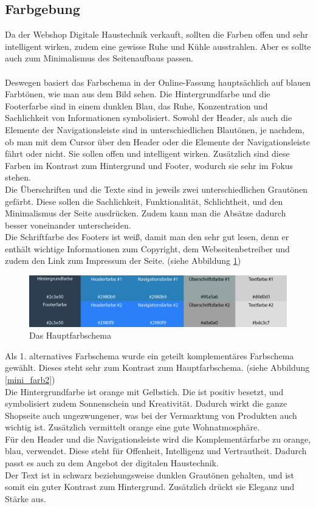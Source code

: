 	\subsection{Farbgebung}
	\label{farb_mini}
Da der Webshop Digitale Haustechnik verkauft, sollten die Farben offen und sehr intelligent wirken, zudem eine gewisse Ruhe und Kühle ausstrahlen. Aber es sollte auch zum Minimalismus des Seitenaufbaus passen.
\\
\\
Deswegen basiert das Farbschema in der Online-Fassung hauptsächlich auf blauen Farbtönen, wie man aus dem Bild sehen. Die Hintergrundfarbe und die Footerfarbe sind in einem dunklen Blau, das Ruhe, Konzentration und Sachlichkeit von Informationen symbolisiert. 
Sowohl der Header, als auch die Elemente der Navigationsleiste sind in unterschiedlichen Blautönen, je nachdem, ob man mit dem Cursor über den Header oder die Elemente der Navigationsleiste fährt oder nicht. Sie sollen offen und intelligent wirken. Zusätzlich sind diese Farben im Kontrast zum Hintergrund und Footer, wodurch sie sehr im Fokus stehen.
\\
Die Überschriften und die Texte sind in jeweils zwei unterschiedlichen Grautönen gefärbt. Diese sollen die Sachlichkeit, Funktionalität, Schlichtheit, und den Minimalismus der Seite ausdrücken. Zudem kann man die Absätze dadurch besser voneinander unterscheiden.
\\
Die Schriftfarbe des Footers ist weiß, damit man den sehr gut lesen, denn er enthält wichtige Informationen zum Copyright, dem Webseitenbetreiber und zudem den Link zum Impressum der Seite. (siehe Abbildung \ref{mini_farb1})
\begin{figure} [hp]
\includegraphics[width=\textwidth]{./img/mini_farb1.png}
\caption{Das Hauptfarbschema}
\label{mini_farb1}
\end{figure}

Als 1. alternatives Farbschema wurde ein geteilt komplementäres Farbschema gewählt. Dieses steht sehr zum Kontrast zum Hauptfarbschema. (siehe Abbildung \ref{mini_farb2}) 
\\
Die Hintergrundfarbe ist orange mit Gelbstich. Die ist positiv besetzt, und symbolisiert zudem Sonnenschein und Kreativität. Dadurch wirkt die ganze Shopseite auch ungezwungener, was bei der Vermarktung von Produkten auch wichtig ist. Zusätzlich vermittelt orange eine gute Wohnatmosphäre.
\\
Für den Header und die Navigationsleiste wird die Komplementärfarbe zu orange, blau, verwendet. Diese steht für Offenheit, Intelligenz und Vertrautheit. Dadurch passt es auch zu dem Angebot der digitalen Haustechnik. 
\\
Der Text ist in schwarz beziehungsweise dunklen Grautönen gehalten, und ist somit ein guter Kontrast zum Hintergrund. Zusätzlich drückt sie Eleganz und Stärke aus.


